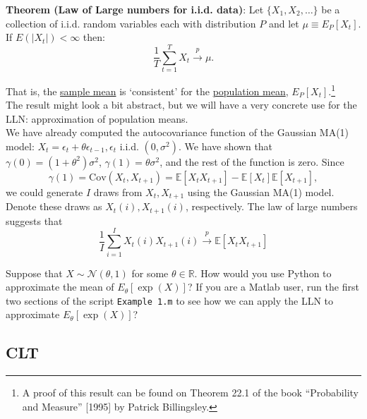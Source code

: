 \documentclass[12] {article}
\begin{document}

 
\noindent \textbf{Theorem (Law of Large numbers for i.i.d. data)}: Let $\{X_1, X_2, \ldots\}$ be a collection of i.i.d. random variables each with distribution $P$ and let $\mu \equiv E_{P}[X_t]$. If $E(|X_t|)<\infty$   then:
\[ \frac{1}{T} \sum_{t=1}^{T} X_t  \overset{p}{\rightarrow} \mu. \]

\noindent That is, the \underline{sample mean} is `consistent’ for the \underline{population mean}, $E_{P}[X_t]$.\footnote{A proof of this result can be found on Theorem 22.1 of the book ``Probability and Measure” [1995] by Patrick Billingsley.} \\

\noindent The result might look a bit abstract, but we will have a very concrete use for the LLN: approximation of population means. \\ 

 We have already computed the autocovariance function of the Gaussian MA(1) model: $X_t = \epsilon_t + \theta \epsilon_{t-1}, \epsilon_{t}$ i.i.d. $(0,\sigma^2)$. We have shown that $\gamma(0)=(1+\theta^2) \sigma^2$, $\gamma(1)=\theta \sigma^2$, and the rest of the function is zero.  Since 
\[\gamma(1) = \textrm{Cov}(X_t, X_{t+1}) = \mathbb{E}[X_t X_{t+1}] - \mathbb{E}[X_t] \mathbb{E}[X_{t+1}],\]
we could generate $I$ draws from $X_t, X_{t+1}$ using the Gaussian MA(1) model. Denote these draws as $X_{t}(i), X_{t+1}(i)$, respectively. The law of large numbers suggests that
\[ \frac{1}{I} \sum_{i=1}^{I} X_{t}(i) X_{t+1}(i) \overset{p}{\rightarrow} \mathbb{E}[ X_t X_{t+1} ]   \]
 
 Suppose that $X \sim \mathcal{N}(\theta,1)$ for some $\theta \in \mathbb{R}$. How would you use Python to approximate the mean of $E_{\theta}[ \exp (X) ]$? If you are a Matlab user, run the first two sections of the script \texttt{Example 1.m} to see how we can apply the LLN to approximate $E_{\theta}[ \exp (X) ]$? \\
 
\subsection{CLT} 
\end{document}
